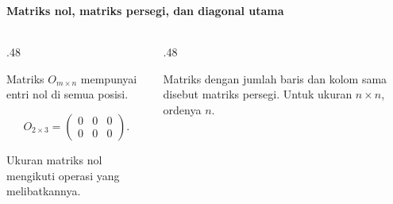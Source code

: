 \documentclass{../../kalkulus-ppt}
\begin{document}
\begin{frame}
    \frametitle{\insertsection}
    \framesubtitle{Matriks nol, matriks persegi, dan diagonal utama}
    \begin{columns}[T,onlytextwidth]
        \begin{column}{.48\textwidth}
            \begin{definisi}
                Matriks $O_{m\times n}$ mempunyai entri nol di semua posisi.
            \end{definisi}
            \begin{contoh}
                \[
                    O_{2\times3}=\begin{pmatrix}0&0&0\\0&0&0\end{pmatrix}.
                \]
            \end{contoh}
            Ukuran matriks nol mengikuti operasi yang melibatkannya.
        \end{column}
        \begin{column}{.48\textwidth}
            \begin{definisi}
                Matriks dengan jumlah baris dan kolom sama disebut matriks persegi. Untuk ukuran $n\times n$, ordenya $n$.
            \end{definisi}
        \end{column}
    \end{columns}
\end{frame}
\end{document}
